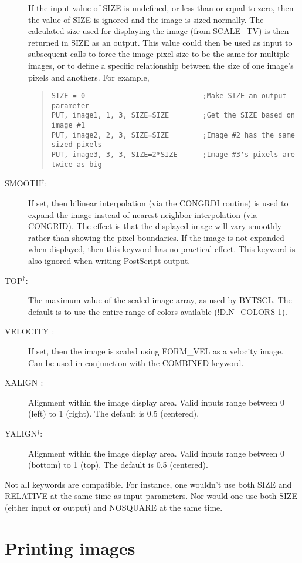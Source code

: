 \begin{description}
If the input value of SIZE is undefined, or less than or equal to zero, then
the value of SIZE is ignored and the image is sized normally.  The calculated
size used for displaying the image (from SCALE\_TV) is then returned in SIZE as
an output.  This value could then be used as input to subsequent calls to force
the image pixel size to be the same for multiple images, or to define a
specific relationship between the size of one image's pixels and anothers.  For
example,
\begin{quote}
\begin{verbatim}
SIZE = 0                            ;Make SIZE an output parameter
PUT, image1, 1, 3, SIZE=SIZE        ;Get the SIZE based on image #1
PUT, image2, 2, 3, SIZE=SIZE        ;Image #2 has the same sized pixels
PUT, image3, 3, 3, SIZE=2*SIZE      ;Image #3's pixels are twice as big
\end{verbatim}
\end{quote}
\item[SMOOTH$^\dagger$:]
If set, then bilinear interpolation (via the CONGRDI routine) is used to expand
the image instead of nearest neighbor interpolation (via CONGRID).  The effect
is that the displayed image will vary smoothly rather than showing the pixel
boundaries.  If the image is not expanded when displayed, then this keyword has
no practical effect.  This keyword is also ignored when writing PostScript
output.
\item[TOP$^\dagger$:]
The maximum value of the scaled image array, as used by BYTSCL.  The default is
to use the entire range of colors available (!D.N\_COLORS-1).
\item[VELOCITY$^\dagger$:]
If set, then the image is scaled using FORM\_VEL as a velocity image.  Can be
used in conjunction with the COMBINED keyword.
\item[XALIGN$^\dagger$:]
Alignment within the image display area.  Valid inputs range between 0 (left)
to 1 (right).  The default is 0.5 (centered).
\item[YALIGN$^\dagger$:]
Alignment within the image display area.  Valid inputs range between 0 (bottom)
to 1 (top).  The default is 0.5 (centered).
\end{description}

Not all keywords are compatible.  For instance, one wouldn't use both SIZE and
RELATIVE at the same time as input parameters.  Nor would one use both SIZE
(either input or output) and NOSQUARE at the same time.

\section{Printing images}

